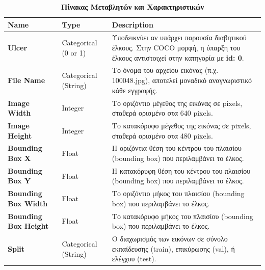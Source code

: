 \documentclass[a4paper,12pt]{report}
\newcommand{\gr}{\selectlanguage{greek}}
\newcommand{\en}{\selectlanguage{english}}
\begin{document}
\begin{table}
\centering
\renewcommand{\arraystretch}{1.5}
\begin{tabular}{|>{\columncolor[HTML]{99CC66}}p{4cm}|>{\columncolor[HTML]{99CC66}}p{4cm}|>{\columncolor[HTML]{99CC66}}p{7cm}|}
\hline
\en\textbf{Name} & \en\textbf{Type} & \en\textbf{Description} \\ \hline

\rowcolor[HTML]{E6F2DA}
\en\textbf{Ulcer} & \en Categorical (0 or 1) & \gr Υποδεικνύει αν υπάρχει παρουσία διαβητικού έλκους. \gr Στην \en COCO \gr μορφή, η ύπαρξη του έλκους αντιστοιχεί στην κατηγορία με \en \textbf{id: 0}. \\ \hline

\rowcolor[HTML]{E6F2DA}
\en\textbf{File Name} & \en Categorical (String) & \gr Το όνομα του αρχείου εικόνας (π.χ. \en 100048.jpg\gr ), αποτελεί μοναδικό αναγνωριστικό κάθε εγγραφής. \\ \hline

\rowcolor[HTML]{E6F2DA}
\en\textbf{Image Width} & \en Integer & \gr Το οριζόντιο μέγεθος της εικόνας σε \en pixels\gr , σταθερά ορισμένο στα \en 640 pixels\gr . \\ \hline

\rowcolor[HTML]{E6F2DA}
\en\textbf{Image Height} & \en Integer & \gr Το κατακόρυφο μέγεθος της εικόνας σε \en pixels\gr , σταθερά ορισμένο στα \en 480 pixels\gr . \\ \hline

\rowcolor[HTML]{E6F2DA}
\en\textbf{Bounding Box X} & \en Float & \gr Η οριζόντια θέση του κέντρου του πλαισίου \en (bounding box) \gr που περιλαμβάνει το έλκος. \\ \hline

\rowcolor[HTML]{E6F2DA}
\en\textbf{Bounding Box Y} & \en Float & \gr Η κατακόρυφη θέση του κέντρου του πλαισίου \en (bounding box) \gr που περιλαμβάνει το έλκος. \\ \hline

\rowcolor[HTML]{E6F2DA}
\en\textbf{Bounding Box Width} & \en Float & \gr Το οριζόντιο μήκος του πλαισίου \en (bounding box) \gr που περιλαμβάνει το έλκος. \\ \hline

\rowcolor[HTML]{E6F2DA}
\en\textbf{Bounding Box Height} & \en Float & \gr Το κατακόρυφο μήκος του πλαισίου \en (bounding box) \gr που περιλαμβάνει το έλκος. \\ \hline

\rowcolor[HTML]{E6F2DA}
\en\textbf{Split} & \en Categorical (String) & \gr Ο διαχωρισμός των εικόνων σε σύνολο εκπαίδευσης \en (train)\gr , επικύρωσης \en (val)\gr , ή ελέγχου \en (test)\gr . \\ \hline

\end{tabular}
\caption{\gr \textbf{Πίνακας Μεταβλητών και Χαρακτηριστικών}}
\end{table}
\end{document}
